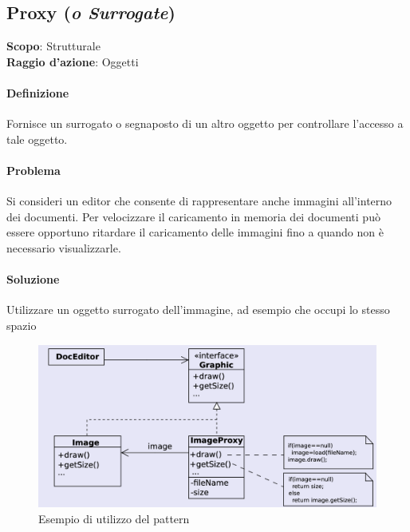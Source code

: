 \subsection{Proxy (\textit{o Surrogate})}
\label{proxy}

\textbf{Scopo}: Strutturale \\
\textbf{Raggio d'azione}: Oggetti

\paragraph{Definizione} Fornisce un surrogato o segnaposto di un altro oggetto per controllare l'accesso a tale oggetto.

\paragraph{Problema} Si consideri un editor che consente di rappresentare anche immagini all’interno dei documenti. Per velocizzare il caricamento in memoria dei documenti può essere opportuno ritardare il caricamento delle immagini fino a quando non è necessario visualizzarle.

\paragraph{Soluzione} Utilizzare un oggetto surrogato dell’immagine, ad esempio che occupi lo stesso spazio

\begin{figure}[H]
    \centering
    \includegraphics[width=1\linewidth]{assets/pattern/proxy/proxy-esempio.png}
    \caption{Esempio di utilizzo del pattern}
\end{figure}

